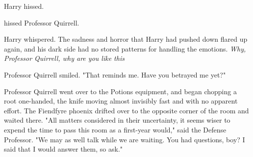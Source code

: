  Harry hissed.

 hissed Professor Quirrell.

 Harry whispered. The sadness and horror that Harry had pushed
down flared up again, and his dark side had no stored patterns for handling the
emotions. \emph{Why, Professor Quirrell, why are you like this{\el}}

Professor Quirrell smiled. "That reminds me. Have you betrayed me yet?"


Professor Quirrell went over to the Potions equipment, and began chopping a
root one-handed, the knife moving almost invisibly fast and with no apparent
effort. The Fiendfyre phoenix drifted over to the opposite corner of the room
and waited there. "All matters considered in their uncertainty, it seems wiser
to expend the time to pass this room as a first-year would," said the Defense
Professor. "We may as well talk while we are waiting. You had questions, boy? I
said that I would answer them, so ask."
